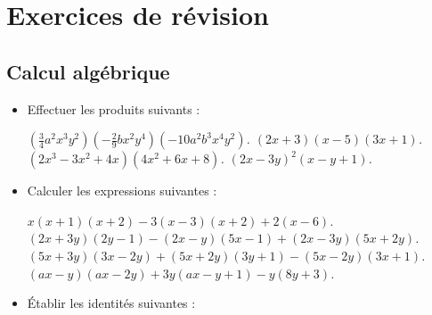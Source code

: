 \chapter*{Exercices de révision}

\section*{Calcul algébrique}


\begin{itemize}
\it On donne sur un axe quatre points $A$, $B$, $C$, $D$. Démontrer la relation : $\overline{AC} + \overline{BD} = \overline{AD} + \overline{BC}$.
\it Soient sur un axe deux points $A$ et $B$ d'abscisses $a$ et $b$. Calculer les abscisses des points $M$ et $N$ qui partagent $[AB]$ en $3$ parties égales.
\it On donne sur un axe trois points $A$, $B$ et $C$ d'abscisses $a$, $b$ et $c$. Trouver l'abscisse du point $G$ tel que $\overline{GA}+\overline{GB}+\overline{GC}=0$.
\it Soient sur un axe $4$ points, $A$, $B$, $C$ et $D$. Démontrer la relation : \[ \overline{AB}.\overline{CD} + \overline{BC}.\overline{AD}+\overline{CA}.\overline{BD}=0.\]
\it On donne sur un axe $3$ points, $A$, $B$ et $M$. On désigne par $O$ le milieu de $[AB]$. Démontrer les relations : 
\[ \overline{MA} + \overline{MB} = 2 \overline{MO}.\phantom{miaoumiaoumiaou} \overline{MA}.\overline{MB}=
\overline{MO}^2-\frac{\overline{AB}^2}4.\]
\it Soient deux points $A$ et $B$ d'un axe, $O$ le milieu de $[AB]$ et $M$ un point quelconque de l'axe.
Démontrer les relations : 
\[ \overline{MA}^2 + \overline{MB}^2 = 2 \overline{MO}^2+\frac{\overline{AB}^2}2.\phantom{miaoumiaoumiaou} \overline{MA}^2-\overline{MB}^2=2\overline{AB}.\overline{OM}\]
\item Effectuer les produits suivants : \begin{itemize}
\it $\left(\frac34 a^2x^3y^2\right)\left(-\frac29 bx^2y^4\right)(-10a^2b^3x^4y^2)$.
\it $(2x+3)(x-5)(3x+1)$.
\it $(2x^3-3x^2+4x)(4x^2+6x+8)$.
\it $(2x-3y)^2(x-y+1)$.
\end{itemize}
\item Calculer les expressions suivantes : \begin{itemize}
\it $x(x+1)(x+2)-3(x-3)(x+2)+2(x-6)$.
\it $(2x+3y)(2y-1)-(2x-y)(5x-1)+(2x-3y)(5x+2y)$.
\it $(5x+3y)(3x-2y)+(5x+2y)(3y+1)-(5x-2y)(3x+1)$.
\it $(ax-y)(ax-2y)+3y(ax-y+1)-y(8y+3)$.
\end{itemize}
\item Établir les identités suivantes : 
\begin{itemize}

\end{itemize}
\end{itemize}
